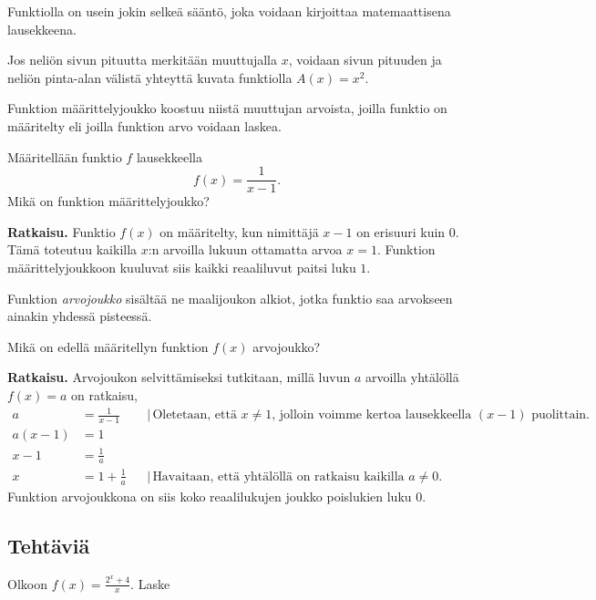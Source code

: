 Funktiolla on usein jokin selkeä sääntö, joka voidaan kirjoittaa
matemaattisena lausekkeena.

\begin{esimerkki}
Jos neliön sivun pituutta merkitään muuttujalla $x$, voidaan sivun pituuden
ja neliön pinta-alan välistä yhteyttä kuvata funktiolla
$A(x) = x^2$.
\end{esimerkki}

Funktion määrittelyjoukko koostuu niistä muuttujan arvoista, joilla
funktio on määritelty eli joilla funktion arvo voidaan laskea.

\begin{esimerkki}
Määritellään funktio $f$ lausekkeella
\[
f(x) = \frac{1}{x-1}.
\]
Mikä on funktion määrittelyjoukko?

\textbf{Ratkaisu.}
Funktio $f(x)$ on määritelty, kun nimittäjä $x-1$ on erisuuri
kuin 0. Tämä toteutuu kaikilla $x$:n arvoilla lukuun ottamatta
arvoa $x = 1$. Funktion määrittelyjoukkoon kuuluvat siis
kaikki reaaliluvut paitsi luku $1$.
\end{esimerkki}

Funktion \emph{arvojoukko} sisältää ne maalijoukon alkiot,
jotka funktio saa arvokseen ainakin yhdessä pisteessä.

\begin{esimerkki}
Mikä on edellä määritellyn funktion $f(x)$ arvojoukko?

\textbf{Ratkaisu.}
Arvojoukon selvittämiseksi tutkitaan, millä luvun $a$ arvoilla
yhtälöllä $f(x) = a$ on ratkaisu,
\begin{align*}
a &= \frac{1}{x-1} & &| \, \text{Oletetaan, että $x \neq 1$, jolloin voimme kertoa lausekkeella $(x-1)$ puolittain.} \\
a(x-1) &= 1 \\
x-1 &= \frac{1}{a} \\
x &= 1+\frac{1}{a} & &| \, \text{Havaitaan, että yhtälöllä on ratkaisu
kaikilla $a \neq 0$.}
\end{align*}
Funktion arvojoukkona on siis koko reaalilukujen joukko poislukien luku $0$.
\end{esimerkki}


\subsection*{Tehtäviä}
\begin{tehtava}
Olkoon $f(x)=\frac{2^x+4}{x}$. Laske
\begin{alakohdat}
\end{alakohdat}
\begin{vastaus}
\begin{alakohdat}
\end{alakohdat}
\end{vastaus}
\end{tehtava}

